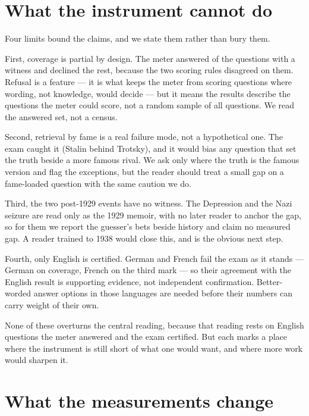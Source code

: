 \documentclass[11pt]{article}
\begin{document}
\section{What the instrument cannot do}\label{sec:limits}

Four limits bound the claims, and we state them rather than bury them.

First, coverage is partial by design. The meter answered \NnCovered{} of the \NnMeasured{} questions with a
witness and declined the rest, because the two scoring rules disagreed on them. Refusal is a feature --- it
is what keeps the meter from scoring questions where wording, not knowledge, would decide --- but it means
the results describe the questions the meter could score, not a random sample of all questions. We read the
answered set, not a census.

Second, retrieval by fame is a real failure mode, not a hypothetical one. The exam caught it (Stalin behind
Trotsky), and it would bias any question that set the truth beside a more famous rival. We ask only where
the truth is the famous version and flag the exceptions, but the reader should treat a small gap on a
fame-loaded question with the same caution we do.

Third, the two post-1929 events have no witness. The Depression and the Nazi seizure are read only as the
1929 memoir, with no later reader to anchor the gap, so for them we report the guesser's bets beside history
and claim no measured gap. A reader trained to 1938 would close this, and is the obvious next step.

Fourth, only English is certified. German and French fail the exam as it stands --- German on coverage,
French on the third mark --- so their agreement with the English result is supporting evidence, not
independent confirmation. Better-worded answer options in those languages are needed before their numbers
can carry weight of their own.

None of these overturns the central reading, because that reading rests on English questions the meter
answered and the exam certified. But each marks a place where the instrument is still short of what one
would want, and where more work would sharpen it.

\section{What the measurements change}\label{sec:implications}
\end{document}
